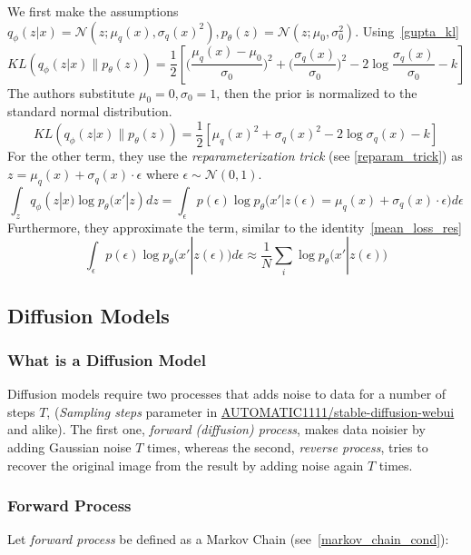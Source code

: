 \documentclass{article}
\numberwithin{equation}{subsection}
\begin{document}
We first make the assumptions $q_\phi(z|x)=\mathcal{N}(z;\mu_q(x),\sigma_q(x)^2), p_\theta(z)=\mathcal{N}(z;\mu_0,\sigma_0^2)$. Using~\ref{gupta_kl}
\begin{equation}
    KL(q_\phi(z|x) \parallel p_\theta(z)) = \frac{1}{2}\left[\Big(\frac{\mu_q(x)-\mu_0}{\sigma_0}\Big)^2+\Big(\frac{\sigma_q(x)}{\sigma_0}\Big)^2-2\log\frac{\sigma_q(x)}{\sigma_0} - k\right]
\end{equation}
The authors substitute $\mu_0=0,\sigma_0=1$, then the prior is normalized to the standard normal distribution.
\begin{equation}
    KL(q_\phi(z|x) \parallel p_\theta(z)) = \frac{1}{2}\left[\mu_q(x)^2+\sigma_q(x)^2-2\log\sigma_q(x) - k\right]
\end{equation}
For the other term, they use the \textit{reparameterization trick} (see \ref{reparam_trick}) as $z = \mu_q(x)+\sigma_q(x) \cdot \epsilon$ where $\epsilon \sim \mathcal{N}(0,1)$.
\begin{equation}
    \int_z q_\phi(z|x)\log p_\theta(x'|z)dz = \int_\epsilon p(\epsilon)\log p_\theta \big(x'|z(\epsilon) = \mu_q(x)+\sigma_q(x) \cdot \epsilon \big)d\epsilon
\end{equation}
Furthermore, they approximate the term, similar to the identity~\ref{mean_loss_res}
\begin{equation}
    \int_\epsilon p(\epsilon)\log p_\theta \big(x'|z(\epsilon) \big)d\epsilon \approx \frac{1}{N}\sum_i \log p_\theta \big(x'|z(\epsilon) \big)
\end{equation}
\subsection{Diffusion Models}
\subsubsection{What is a Diffusion Model}

Diffusion models require two processes that adds noise to data for a number of steps $T$, (\textit{Sampling steps} parameter in \href{https://github.com/AUTOMATIC1111/stable-diffusion-webui}{AUTOMATIC1111/stable-diffusion-webui} and alike). The first one, \textit{forward (diffusion) process}, makes data noisier by adding Gaussian noise $T$ times, whereas the second, \textit{reverse process}, tries to recover the original image from the result by adding noise again $T$ times. 
\subsubsection{Forward Process}
Let \textit{forward process} be defined as a Markov Chain (see~\ref{markov_chain_cond}):
\end{document}
